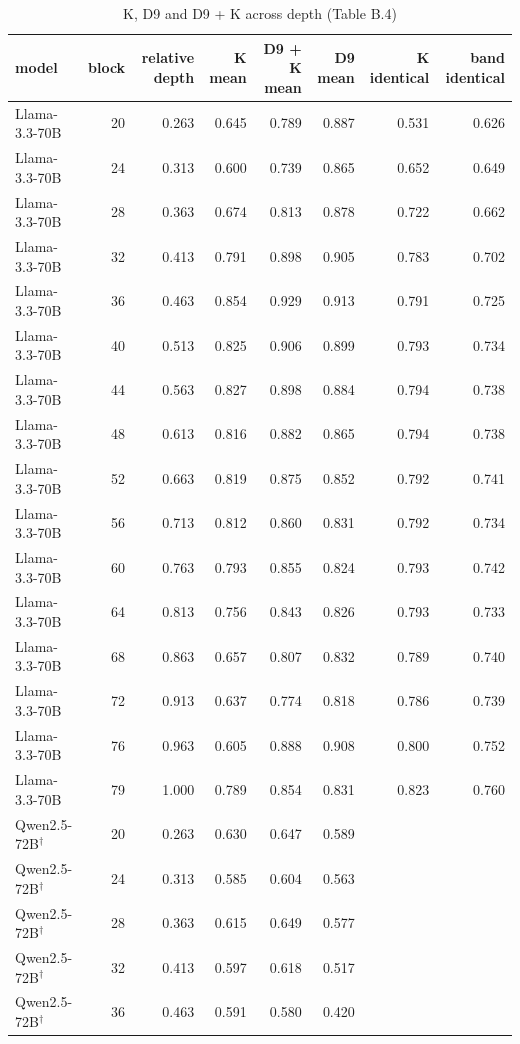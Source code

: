\begin{table}
\caption{K, D9 and D9 + K across depth (Table B.4)}
\label{tab:x-k_depth}
\begin{tabular}{lrrrrrrr}
\toprule
model & block & relative depth & K mean & D9 + K mean & D9 mean & K identical & band identical \\
\midrule
Llama-3.3-70B & 20 & 0.263 & 0.645 & 0.789 & 0.887 & 0.531 & 0.626 \\
Llama-3.3-70B & 24 & 0.313 & 0.600 & 0.739 & 0.865 & 0.652 & 0.649 \\
Llama-3.3-70B & 28 & 0.363 & 0.674 & 0.813 & 0.878 & 0.722 & 0.662 \\
Llama-3.3-70B & 32 & 0.413 & 0.791 & 0.898 & 0.905 & 0.783 & 0.702 \\
Llama-3.3-70B & 36 & 0.463 & 0.854 & 0.929 & 0.913 & 0.791 & 0.725 \\
Llama-3.3-70B & 40 & 0.513 & 0.825 & 0.906 & 0.899 & 0.793 & 0.734 \\
Llama-3.3-70B & 44 & 0.563 & 0.827 & 0.898 & 0.884 & 0.794 & 0.738 \\
Llama-3.3-70B & 48 & 0.613 & 0.816 & 0.882 & 0.865 & 0.794 & 0.738 \\
Llama-3.3-70B & 52 & 0.663 & 0.819 & 0.875 & 0.852 & 0.792 & 0.741 \\
Llama-3.3-70B & 56 & 0.713 & 0.812 & 0.860 & 0.831 & 0.792 & 0.734 \\
Llama-3.3-70B & 60 & 0.763 & 0.793 & 0.855 & 0.824 & 0.793 & 0.742 \\
Llama-3.3-70B & 64 & 0.813 & 0.756 & 0.843 & 0.826 & 0.793 & 0.733 \\
Llama-3.3-70B & 68 & 0.863 & 0.657 & 0.807 & 0.832 & 0.789 & 0.740 \\
Llama-3.3-70B & 72 & 0.913 & 0.637 & 0.774 & 0.818 & 0.786 & 0.739 \\
Llama-3.3-70B & 76 & 0.963 & 0.605 & 0.888 & 0.908 & 0.800 & 0.752 \\
Llama-3.3-70B & 79 & 1.000 & 0.789 & 0.854 & 0.831 & 0.823 & 0.760 \\
Qwen2.5-72B$^\dagger$ & 20 & 0.263 & 0.630 & 0.647 & 0.589 &  &  \\
Qwen2.5-72B$^\dagger$ & 24 & 0.313 & 0.585 & 0.604 & 0.563 &  &  \\
Qwen2.5-72B$^\dagger$ & 28 & 0.363 & 0.615 & 0.649 & 0.577 &  &  \\
Qwen2.5-72B$^\dagger$ & 32 & 0.413 & 0.597 & 0.618 & 0.517 &  &  \\
Qwen2.5-72B$^\dagger$ & 36 & 0.463 & 0.591 & 0.580 & 0.420 &  &  \\

\end{tabular}
\end{table}
